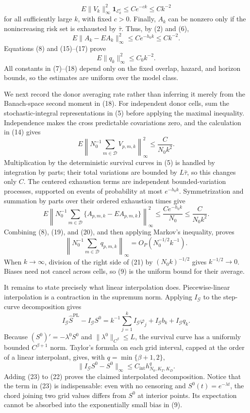 \[
 E\|V_k\|_\infty^2\mathbf 1_{\mathcal E_k^c}
 \le Ce^{-c k}\le Ck^{-2}                                    \tag{16}
\]
for all sufficiently large \(k\), with fixed \(c>0\).  Finally, \(A_k\) can be nonzero only if the nonincreasing risk set is exhausted by \(\bar\tau\).  Thus, by (2) and (6),
\[
 E\|A_k-EA_k\|_\infty^2\le Ce^{-h_0k}\le Ck^{-2}.            \tag{17}
\]
Equations (8) and (15)--(17) prove
\[
 E\|q_k\|_\infty^2\le C_0k^{-2}.                            \tag{18}
\]
All constants in (7)--(18) depend only on the fixed overlap, hazard, and horizon bounds, so the estimates are uniform over the model class.

We next record the donor averaging rate rather than inferring it merely from the Banach-space second moment in (18).  For independent donor cells, sum the stochastic-integral representations in (5) before applying the maximal inequality.  Independence makes the cross predictable covariations zero, and the calculation in (14) gives
\[
 E\left\|N_0^{-1}\sum_{m\in\mathcal D}V_{p,m,k}\right\|_\infty^2
 \le \frac{C}{N_0k^2}.                                      \tag{19}
\]
Multiplication by the deterministic survival curves in (5) is handled by integration by parts; their total variations are bounded by \(L\bar\tau\), so this changes only \(C\).  The centered exhaustion terms are independent bounded-variation processes, supported on events of probability at most \(e^{-h_0k}\).  Symmetrization and summation by parts over their ordered exhaustion times give
\[
 E\left\|N_0^{-1}\sum_{m\in\mathcal D}
       \{A_{p,m,k}-EA_{p,m,k}\}\right\|_\infty^2
 \le \frac{Ce^{-h_0k}}{N_0}
 \le \frac{C}{N_0k^2}.                                      \tag{20}
\]
Combining (8), (19), and (20), and then applying Markov's inequality, proves
\[
 \left\|N_0^{-1}\sum_{m\in\mathcal D}q_{p,m,k}\right\|_\infty
 =O_P(N_0^{-1/2}k^{-1}).                                     \tag{21}
\]
When \(k\to\infty\), division of the right side of (21) by \((N_0k)^{-1/2}\) gives \(k^{-1/2}\to0\).  Biases need not cancel across cells, so (9) is the uniform bound for their average.

It remains to state precisely what linear interpolation does.  Piecewise-linear interpolation is a contraction in the supremum norm.  Applying \(I_{\mathcal G}\) to the step-curve decomposition gives
\[
 I_{\mathcal G}\widehat S^{\mathrm{PL}}-I_{\mathcal G}S^0
 =k^{-1}\sum_{j=1}^kI_{\mathcal G}\varphi_j
  +I_{\mathcal G}b_k+I_{\mathcal G}q_k.                     \tag{22}
\]
Because \((S^0)'=-\lambda^0S^0\) and \(\|\lambda^0\|_{C^\beta}\le L\), the survival curve has a uniformly bounded \(C^{\beta+1}\) norm.  Taylor's formula on each grid interval, capped at the order of a linear interpolant, gives, with \(q=\min\{\beta+1,2\}\),
\[
 \|I_{\mathcal G}S^0-S^0\|_\infty
 \le C_{\mathrm{int}}h_{N_0,K_T,K_D}^{q}.                   \tag{23}
\]
Adding (23) to (22) proves the claimed interpolated decomposition.  Notice that the term in (23) is indispensable: even with no censoring and \(S^0(t)=e^{-\lambda t}\), the chord joining two grid values differs from \(S^0\) at interior points.  Its expectation cannot be absorbed into the exponentially small bias in (9).

